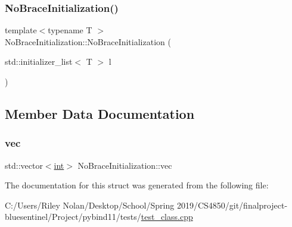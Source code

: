 \mbox{\label{struct_no_brace_initialization_a5879859223c8d45a7afddd9abbed0289}} 
\subsubsection{\texorpdfstring{NoBraceInitialization()}{NoBraceInitialization()}\hspace{0.1cm}{\footnotesize\ttfamily [2/2]}}
{\footnotesize\ttfamily template$<$typename T $>$ \\
No\+Brace\+Initialization\+::\+No\+Brace\+Initialization (\begin{DoxyParamCaption}\item[{std\+::initializer\+\_\+list$<$ T $>$}]{l }\end{DoxyParamCaption})\hspace{0.3cm}{\ttfamily [inline]}}



\subsection{Member Data Documentation}
\mbox{\label{struct_no_brace_initialization_a2671bf72ded90c5c4647cc5e1e3bec04}} 
\subsubsection{\texorpdfstring{vec}{vec}}
{\footnotesize\ttfamily std\+::vector$<$\mbox{\hyperlink{warnings_8h_a74f207b5aa4ba51c3a2ad59b219a423b}{int}}$>$ No\+Brace\+Initialization\+::vec}



The documentation for this struct was generated from the following file\+:\begin{DoxyCompactItemize}
\item 
C\+:/\+Users/\+Riley Nolan/\+Desktop/\+School/\+Spring 2019/\+C\+S4850/git/finalproject-\/bluesentinel/\+Project/pybind11/tests/\mbox{\hyperlink{test__class_8cpp}{test\+\_\+class.\+cpp}}\end{DoxyCompactItemize}
